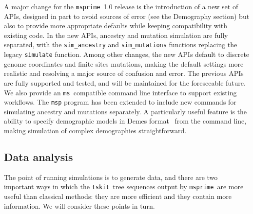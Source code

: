 \documentclass{article}
\newcommand{\msprime}[0]{\texttt{msprime}}
\newcommand{\tskit}[0]{\texttt{tskit}}
\newcommand{\ms}[0]{\texttt{ms}}
\begin{document}
A major change for the \msprime\ 1.0 release is the introduction of a new set of APIs,
designed in part to avoid sources of error (see the Demography section) but
also to provide more appropriate defaults while keeping compatibility with
existing code. In the new APIs, ancestry and mutation simulation are fully
separated, with the \texttt{sim\_ancestry} and \texttt{sim\_mutations}
functions replacing the legacy \texttt{simulate} function. Among other changes,
the new APIs default to discrete genome coordinates and finite sites mutations,
making the default settings more realistic and resolving a major source of confusion and error.
The previous APIs are fully
supported and tested, and will be maintained for the foreseeable future.
We also provide an \ms\ compatible
command line interface to support existing workflows. The
\texttt{msp} program has been extended to include new commands
for simulating ancestry and mutations separately. A particularly useful
feature is the ability to specify demographic models in
Demes format~\citep{gower2021demes} from the command line,
making simulation of complex demographies straightforward.

\subsection*{Data analysis}
\label{sec-data-analysis}
The point of running simulations is to generate data, and there
are two important ways in which the \tskit\ tree sequences output by
\msprime\ are more useful than classical methods:
they are more efficient and they contain more information.
We will consider these points in turn.
\end{document}
